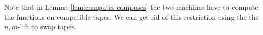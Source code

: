 \documentclass{psartcl}
\newcommand{\MS}[1]{\textsf{#1}}
\newcommand{\nil}{\MS{nil}}
\newcommand{\true}{\mathbf{true}}
\newcommand{\false}{\mathbf{false}}
\begin{document}
Note that in Lemma \ref{lem:computes-composes} the two machines have to compute the functions on compatible tapes.
We can get rid of this restriction using the the $n,m$-lift to swap tapes.

\end{document}
